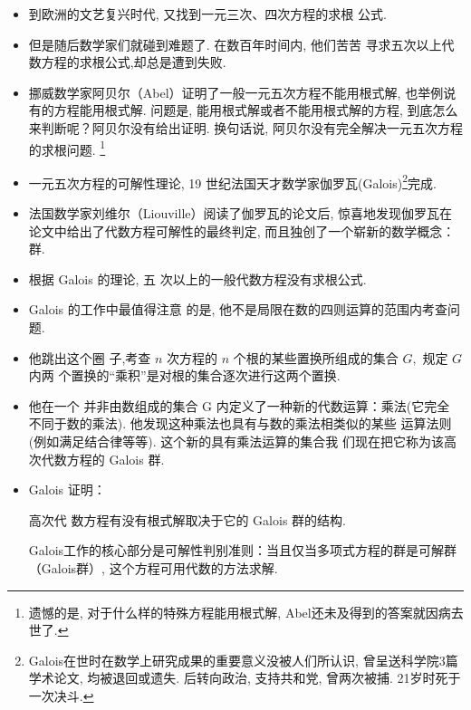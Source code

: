 \documentclass[10pt,punct]{ctexbeamer}
\begin{document}
\begin{frame}



\begin{itemize}
\item 到欧洲的文艺复兴时代, 又找到\alert{一元三次、四次方程}的求根 公式.
    \item 但是随后数学家们就碰到难题了. 在数百年时间内, 他们苦苦 寻求五次以上代数方程的求根公式,却总是遭到失败.
\item 挪威数学家阿贝尔（Abel）证明了一般一元五次方程不能用根式解, 也举例说有的方程能用根式解. 问题是, 能用根式解或者不能用根式解的方程, 到底怎么来判断呢？阿贝尔没有给出证明. 换句话说, 阿贝尔没有完全解决一元五次方程的求根问题. \footnote{遗憾的是, 对于什么样的特殊方程能用根式解, Abel还未及得到的答案就因病去世了. }

\item 一元五次方程的可解性理论, 19 世纪法国天才数学家伽罗瓦(Galois)\footnote{Galois在世时在数学上研究成果的重要意义没被人们所认识, 曾呈送科学院3篇学术论文, 均被退回或遗失. 后转向政治, 支持共和党, 曾两次被捕. 21岁时死于一次决斗. }完成.

\item 法国数学家刘维尔（Liouville）阅读了伽罗瓦的论文后, 惊喜地发现伽罗瓦在论文中给出了代数方程可解性的最终判定, 而且独创了一个崭新的数学概念：群.

\end{itemize}
\end{frame}



\begin{frame}
\begin{itemize}
	\item
	根据 Galois 的理论, 五 次以上的一般代数方程没有求根公式.

	\item Galois 的工作中最值得注意 的是, 他不是局限在数的四则运算的范围内考查问题.

	\item 他跳出这个圈 子,考查 $n$ 次方程的 $n$ 个根的某些\alert{置换}所组成的集合 $G,$ 规定 $G$ 内两 个置换的“乘积”是对根的集合逐次进行这两个置换.

	\item 他在一个 并非由数组成的集合 G 内定义了一种新的代数运算：\alert{乘法}(它完全 不同于数的乘法). 他发现这种乘法也具有与数的乘法相类似的某些 运算法则(例如满足结合律等等). 这个新的具有乘法运算的集合我 们现在把它称为该高次代数方程的 \alert{Galois 群}.

	\item Galois 证明：
\begin{center}
高次代 数方程有没有根式解取决于它的 Galois 群的结构.
\end{center}

Galois工作的核心部分是可解性判别准则：当且仅当多项式方程的群是可解群（Galois群）, 这个方程可用代数的方法求解.
\end{itemize}
\end{frame}
\end{document}
